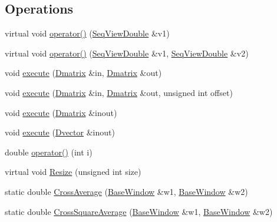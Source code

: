 \subsection*{Operations}
\begin{DoxyCompactItemize}
\item 
virtual void \hyperlink{classtsa_1_1_base_window_a05d9edb95dc01840a1b2df78dfa3a8c1}{operator()} (\hyperlink{namespacetsa_ac599574bcc094eda25613724b8f3ca9e}{Seq\+View\+Double} \&v1)
\item 
virtual void \hyperlink{classtsa_1_1_base_window_afda50daa943527e09792b06e5ba69bcb}{operator()} (\hyperlink{namespacetsa_ac599574bcc094eda25613724b8f3ca9e}{Seq\+View\+Double} \&v1, \hyperlink{namespacetsa_ac599574bcc094eda25613724b8f3ca9e}{Seq\+View\+Double} \&v2)
\item 
void \hyperlink{classtsa_1_1_base_window_a15647cb85344c7e82ecde50675b07efd}{execute} (\hyperlink{namespacetsa_ad260cd21c1891c4ed391fe788569aba4}{Dmatrix} \&in, \hyperlink{namespacetsa_ad260cd21c1891c4ed391fe788569aba4}{Dmatrix} \&out)
\item 
void \hyperlink{classtsa_1_1_base_window_a7e4b5f7d87bbe397332b4e506b0681c2}{execute} (\hyperlink{namespacetsa_ad260cd21c1891c4ed391fe788569aba4}{Dmatrix} \&in, \hyperlink{namespacetsa_ad260cd21c1891c4ed391fe788569aba4}{Dmatrix} \&out, unsigned int offset)
\item 
void \hyperlink{classtsa_1_1_base_window_a34b933da998ba8137d0e0def7514d2cb}{execute} (\hyperlink{namespacetsa_ad260cd21c1891c4ed391fe788569aba4}{Dmatrix} \&inout)
\item 
void \hyperlink{classtsa_1_1_base_window_abadd3d1ef579310ab440a70d77e1d46d}{execute} (\hyperlink{namespacetsa_a8900fb03d849baf447a1a0efe2561fb2}{Dvector} \&inout)
\item 
double \hyperlink{classtsa_1_1_base_window_ab9dc5e39e09701b60b9e160837f059df}{operator()} (int i)
\item 
virtual void \hyperlink{classtsa_1_1_base_window_a8a2a3425f2915762d50fa57dd0e04f22}{Resize} (unsigned int size)
\item 
static double \hyperlink{classtsa_1_1_base_window_a4bd3edc44a56103ac3f9112a55a10420}{Cross\+Average} (\hyperlink{classtsa_1_1_base_window}{Base\+Window} \&w1, \hyperlink{classtsa_1_1_base_window}{Base\+Window} \&w2)
\item 
static double \hyperlink{classtsa_1_1_base_window_a31f86887f9ccbddd97bdca903c506606}{Cross\+Square\+Average} (\hyperlink{classtsa_1_1_base_window}{Base\+Window} \&w1, \hyperlink{classtsa_1_1_base_window}{Base\+Window} \&w2)
\end{DoxyCompactItemize}


